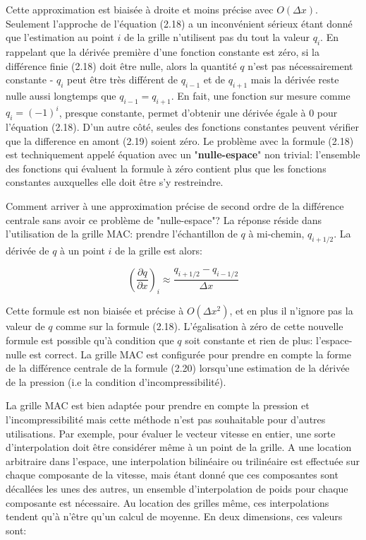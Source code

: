 \documentclass[11pt]{report}
\begin{document}
Cette approximation est biaisée à droite et moins précise avec $ O(\Delta x) $. Seulement l'approche de l'équation (2.18) a un inconvénient sérieux étant donné que l'estimation au point $i$ de la grille n'utilisent pas du tout la valeur $ q_i $. En rappelant que la dérivée première d'une fonction constante est zéro, si la différence finie (2.18) doit être nulle, alors la quantité $ q $ n'est pas nécessairement constante - $ q_i$ peut être très différent de $ q_{i-1} $ et de $ q_{i+1}$ mais la dérivée reste nulle aussi longtemps que $ q_{i-1} = q_{i+1}$. En fait, une fonction sur mesure comme $ q_i = (-1)^i $, presque constante, permet d'obtenir une dérivée égale à 0 pour l'équation (2.18). D'un autre côté, seules des fonctions constantes peuvent vérifier que la difference en amont (2.19) soient zéro. Le problème avec la formule (2.18) est techniquement appelé équation avec un "\textbf{nulle-espace}" non trivial: l'ensemble des fonctions qui évaluent la formule à zéro contient plus que les fonctions constantes auxquelles elle doit être s'y restreindre.\newline

Comment arriver à une approximation précise de second ordre de la différence centrale sans avoir ce problème de "nulle-espace"? La réponse réside dans l'utilisation de la grille MAC: prendre l'échantillon de $ q $ à mi-chemin, $ q_{i+1/2} $. La dérivée de $q$ à un point $i$ de la grille est alors:

\begin{equation}
\left(\frac{\partial q}{\partial x}\right)_i \approx \frac{q_{i+1/2} - q_{i-1/2}}{ \Delta x}
\end{equation}
 
Cette formule est non biaisée et précise à $O(\Delta x^2)$, et en plus il n'ignore pas la valeur de $q$ comme sur la formule (2.18). L'égalisation à zéro de cette nouvelle formule est possible qu'à condition que $q$ soit constante et rien de plus: l'espace-nulle est correct. La grille MAC est configurée pour prendre en compte la forme de la différence centrale de la formule (2.20) lorsqu'une estimation de la dérivée de la pression (i.e la condition d'incompressibilité).\newline

La grille MAC est bien adaptée pour prendre en compte la pression et l'incompressibilité mais cette méthode n'est pas souhaitable pour d'autres utilisations. Par exemple, pour évaluer le vecteur vitesse en entier, une sorte d'interpolation doit être considérer même à un point de la grille. A une location arbitraire dans l'espace, une interpolation bilinéaire ou trilinéaire est effectuée sur chaque composante de la vitesse, mais étant donné que ces composantes sont décallées les unes des autres, un ensemble d'interpolation de poids pour chaque composante est nécessaire. Au location des grilles même, ces interpolations tendent qu'à n'être qu'un calcul de moyenne. En deux dimensions, ces valeurs sont:
\end{document}
